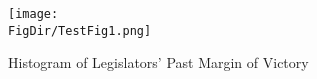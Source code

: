 \hypertarget{TestFig1}{}
\begin{figure}
\centerline{\texttt{[image: \\FigDir/TestFig1.png]}}
\caption{Histogram of Legislators' Past Margin of Victory}
\label{fig:TestFig1}
\end{figure}
